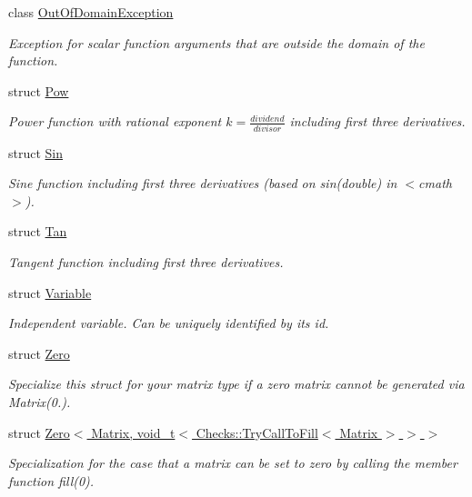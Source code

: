 \begin{DoxyCompactItemize}
class \hyperlink{classFunG_1_1OutOfDomainException}{Out\+Of\+Domain\+Exception}
\begin{DoxyCompactList}\small\item\em Exception for scalar function arguments that are outside the domain of the function. \end{DoxyCompactList}\item 
struct \hyperlink{structFunG_1_1Pow}{Pow}
\begin{DoxyCompactList}\small\item\em Power function with rational exponent $ k = \frac{dividend}{divisor} $ including first three derivatives. \end{DoxyCompactList}\item 
struct \hyperlink{structFunG_1_1Sin}{Sin}
\begin{DoxyCompactList}\small\item\em Sine function including first three derivatives (based on sin(double) in $<$cmath$>$). \end{DoxyCompactList}\item 
struct \hyperlink{structFunG_1_1Tan}{Tan}
\begin{DoxyCompactList}\small\item\em Tangent function including first three derivatives. \end{DoxyCompactList}\item 
struct \hyperlink{structFunG_1_1Variable}{Variable}
\begin{DoxyCompactList}\small\item\em Independent variable. Can be uniquely identified by its id. \end{DoxyCompactList}\item 
struct \hyperlink{structFunG_1_1Zero}{Zero}
\begin{DoxyCompactList}\small\item\em Specialize this struct for your matrix type if a zero matrix cannot be generated via Matrix(0.). \end{DoxyCompactList}\item 
struct \hyperlink{structFunG_1_1Zero_3_01Matrix_00_01void__t_3_01Checks_1_1TryCallToFill_3_01Matrix_01_4_01_4_01_4}{Zero$<$ Matrix, void\+\_\+t$<$ Checks\+::\+Try\+Call\+To\+Fill$<$ Matrix $>$ $>$ $>$}
\begin{DoxyCompactList}\small\item\em Specialization for the case that a matrix can be set to zero by calling the member function fill(0). \end{DoxyCompactList}\end{DoxyCompactItemize}
